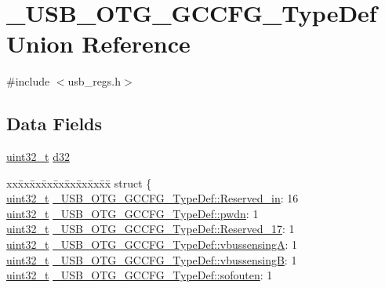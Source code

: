 \hypertarget{union___u_s_b___o_t_g___g_c_c_f_g___type_def}{\section{\-\_\-\-U\-S\-B\-\_\-\-O\-T\-G\-\_\-\-G\-C\-C\-F\-G\-\_\-\-Type\-Def Union Reference}
\label{union___u_s_b___o_t_g___g_c_c_f_g___type_def}
}


{\ttfamily \#include $<$usb\-\_\-regs.\-h$>$}

\subsection*{Data Fields}
\begin{DoxyCompactItemize}
\item 
\hyperlink{stdint_8h_a435d1572bf3f880d55459d9805097f62}{uint32\-\_\-t} \hyperlink{group___u_s_b___o_t_g___d_r_i_v_e_r_ga92b0a669aa19aa3f11506e615975328b}{d32}
\item 
\begin{tabbing}
xx\=xx\=xx\=xx\=xx\=xx\=xx\=xx\=xx\=\kill
struct \{\\
\>\hyperlink{stdint_8h_a435d1572bf3f880d55459d9805097f62}{uint32\_t} \hyperlink{group___u_s_b___o_t_g___d_r_i_v_e_r_ga8242aeaf1ab3d3578762591e4df7f75f}{\_USB\_OTG\_GCCFG\_TypeDef::Reserved\_in}: 16\\
\>\hyperlink{stdint_8h_a435d1572bf3f880d55459d9805097f62}{uint32\_t} \hyperlink{group___u_s_b___o_t_g___d_r_i_v_e_r_ga453a175b65a6fc8f96db36e504304c2b}{\_USB\_OTG\_GCCFG\_TypeDef::pwdn}: 1\\
\>\hyperlink{stdint_8h_a435d1572bf3f880d55459d9805097f62}{uint32\_t} \hyperlink{group___u_s_b___o_t_g___d_r_i_v_e_r_gae0cd177212dfd31bf75e1eee2f58ded7}{\_USB\_OTG\_GCCFG\_TypeDef::Reserved\_17}: 1\\
\>\hyperlink{stdint_8h_a435d1572bf3f880d55459d9805097f62}{uint32\_t} \hyperlink{group___u_s_b___o_t_g___d_r_i_v_e_r_gac18d70824581f11bbd03f2ef67b29b8d}{\_USB\_OTG\_GCCFG\_TypeDef::vbussensingA}: 1\\
\>\hyperlink{stdint_8h_a435d1572bf3f880d55459d9805097f62}{uint32\_t} \hyperlink{group___u_s_b___o_t_g___d_r_i_v_e_r_ga2be201bafae01439bca7d3c5c503e702}{\_USB\_OTG\_GCCFG\_TypeDef::vbussensingB}: 1\\
\>\hyperlink{stdint_8h_a435d1572bf3f880d55459d9805097f62}{uint32\_t} \hyperlink{group___u_s_b___o_t_g___d_r_i_v_e_r_gaee6a6008a6f826c15f2592bcba504bf8}{\_USB\_OTG\_GCCFG\_TypeDef::sofouten}: 1\\

\end{tabbing}
\end{DoxyCompactItemize}
